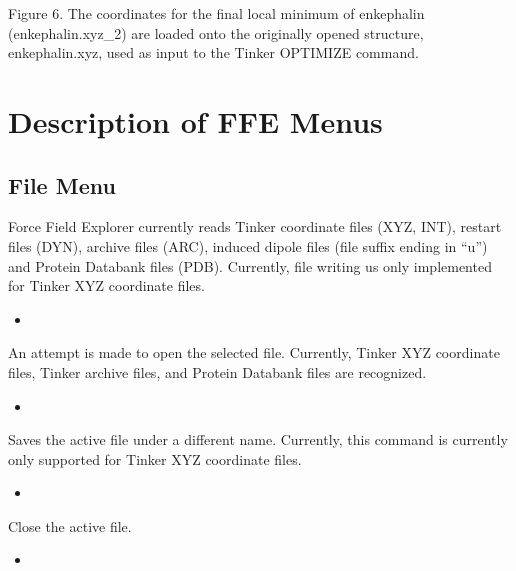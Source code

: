 \documentclass[letterpaper,11pt,english]{sphinxmanual}
\let\sphinxpxdimen\pdfpxdimen\else\newdimen\sphinxpxdimen
\begin{document}
\noindent\sphinxincludegraphics[width=625\sphinxpxdimen]{{figure6}.png}

\sphinxAtStartPar
Figure 6.  The coordinates for the final local minimum of enkephalin (enkephalin.xyz\_2) are loaded onto the originally opened structure, enkephalin.xyz, used as input to the Tinker OPTIMIZE command.

\sphinxstepscope


\chapter{Description of FFE Menus}
\label{\detokenize{text/menus:description-of-ffe-menus}}\label{\detokenize{text/menus::doc}}

\section{File Menu}
\label{\detokenize{text/menus:file-menu}}
\sphinxAtStartPar
Force Field Explorer currently reads Tinker coordinate files (XYZ, INT), restart files (DYN), archive files (ARC), induced dipole files (file suffix ending in “u”) and Protein Databank files (PDB). Currently, file writing us only implemented for Tinker XYZ coordinate files.
\begin{itemize}
\item {} 
\sphinxAtStartPar
{}

\end{itemize}

\sphinxAtStartPar
An attempt is made to open the selected file. Currently, Tinker XYZ coordinate files, Tinker archive files, and Protein Databank files are recognized.
\begin{itemize}
\item {} 
\sphinxAtStartPar
{}

\end{itemize}

\sphinxAtStartPar
Saves the active file under a different name. Currently, this command is currently only supported for Tinker XYZ coordinate files.
\begin{itemize}
\item {} 
\sphinxAtStartPar
{}

\end{itemize}

\sphinxAtStartPar
Close the active file.
\begin{itemize}
\item {} 
\sphinxAtStartPar
{}

\end{itemize}
\end{document}
